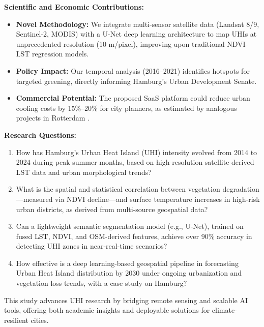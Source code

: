 \documentclass{article}
\begin{document}
\vspace{0.5cm}
\textbf{Scientific and Economic Contributions:}  
\begin{itemize}
    \item \textbf{Novel Methodology:} We integrate multi-sensor satellite data (Landsat 8/9, Sentinel-2, MODIS) with a U-Net deep learning architecture to map UHIs at unprecedented resolution (10 m/pixel), improving upon traditional NDVI-LST regression models.
    \item \textbf{Policy Impact:} Our temporal analysis (2016–2021) identifies hotspots for targeted greening, directly informing Hamburg's Urban Development Senate.
    \item \textbf{Commercial Potential:} The proposed SaaS platform could reduce urban cooling costs by 15\%–20\% for city planners, as estimated by analogous projects in Rotterdam \parencite{Ariza2018}.
\end{itemize}

\textbf{Research Questions:}  
\begin{enumerate}
    \item How has Hamburg's Urban Heat Island (UHI) intensity evolved from 2014 to 2024 during peak summer months, based on high-resolution satellite-derived LST data and urban morphological trends?  
    \item What is the spatial and statistical correlation between vegetation degradation—measured via NDVI decline—and surface temperature increases in high-risk urban districts, as derived from multi-source geospatial data?  
    \item Can a lightweight semantic segmentation model (e.g., U-Net), trained on fused LST, NDVI, and OSM-derived features, achieve over 90\% accuracy in detecting UHI zones in near-real-time scenarios?  
    \item How effective is a deep learning-based geospatial pipeline in forecasting Urban Heat Island distribution by 2030 under ongoing urbanization and vegetation loss trends, with a case study on Hamburg?  
\end{enumerate}


This study advances UHI research by bridging remote sensing and scalable AI tools, offering both academic insights and deployable solutions for climate-resilient cities.
\end{document}
